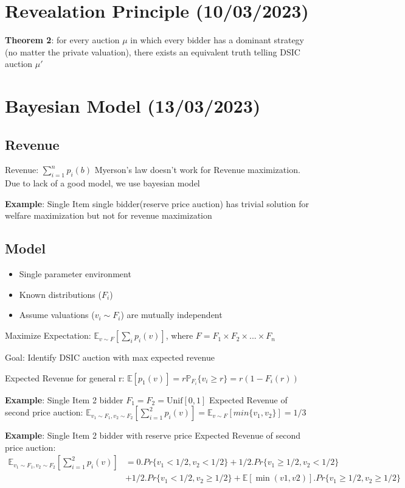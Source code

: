 \documentclass[11pt]{article}
\begin{document}
\section{Revealation Principle (10/03/2023)}
\label{sec:orga8e7df5}
\textbf{Theorem 2}:
for every auction \(\mu\) in which every bidder has a dominant strategy (no matter the private valuation),
there exists an equivalent truth telling DSIC auction \(\mu'\)

\section{Bayesian Model (13/03/2023)}
\label{sec:org032f8ba}
\subsection{Revenue}
\label{sec:orgf3b2a48}
Revenue: \(\sum_{i=1}^n p_i(b)\)
Myerson's law doesn't work for Revenue maximization. Due to lack of a good model, we use bayesian model

\textbf{Example}: Single Item single bidder(reserve price auction) has trivial solution for welfare maximization but not for revenue maximization

\subsection{Model}
\label{sec:org4d5c0a3}
\begin{itemize}
\item Single parameter environment
\item Known distributions (\(F_i\))
\item Assume valuations (\(v_i \sim F_i\)) are mutually independent
\end{itemize}

Maximize Expectation: \(\mathbb{E}_{v \sim F} \left[ \sum_i p_i(v) \right]\), where \(F = F_1 \times F_2 \times ... \times F_n\)

Goal: Identify DSIC auction with max expected revenue

Expected Revenue for general r: \(\mathbb{E} \left[ p_1 (v) \right] = r \mathbb{P}_{F_i}\{ v_i \geq r \} = r(1 - F_i(r))\)

\textbf{Example}: Single Item 2 bidder
\(F_1 = F_2 = \text{Unif}[0, 1]\)
Expected Revenue of second price auction: \(\mathbb{E}_{v_1 \sim F_1, v_2 \sim F_2} [\sum_{i=1}^2 p_i(v)] = \mathbb{E}_{v \sim F} [min \{v_1, v_2\}] = 1/3\)

\textbf{Example}: Single Item 2 bidder with reserve price
Expected Revenue of second price auction:
\begin{align*}
\mathbb{E}_{v_1 \sim F_1, v_2 \sim F_2} \left[ \sum_{i=1}^2 p_i(v) \right] &= 0 . Pr\{v_1 < 1/2, v_2 < 1/2\} + 1/2 . Pr\{v_1 \geq 1/2, v_2 < 1/2\} \\
&+ 1/2 . Pr\{ v_1 < 1/2, v_2 \geq 1/2\} + \mathbb{E}[\min(v1, v2)]. Pr\{v_1 \geq 1/2, v_2 \geq 1/2\}
\end{align*}
\end{document}
